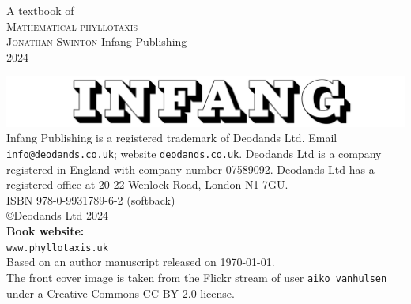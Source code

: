 \newcommand{\jPublicationYear}{2024}

\newlength{\titlepagespacing}

\setlength{\titlepagespacing}{10ex}

\thispagestyle{titlingpage}
{
	\centering
	{\Huge A textbook of }
	\\[3ex]
	{\HUGE\jEmphasisColour	\textsc{Mathematical phyllotaxis}}\\
	\vfill
	{\Huge	\scshape Jonathan Swinton}
	\vfill
	{\Large	Infang Publishing}
	\\[3ex]
	{\Large \textsc{\jPublicationYear}
		\\}
}
\newpage


\thispagestyle{titlingpage}
{
\mbox{}\vspace{\fill}
	
		\includegraphics[width=.6\jfigwidth]{./Figures/infang.jpg}
		\\[10ex]
		Infang Publishing is a registered trademark of Deodands Ltd.
		Email \texttt{info@deodands.co.uk}; website \texttt{deodands.co.uk}.
		Deodands Ltd is a company registered in England with company number 07589092. 
		Deodands Ltd has a registered office at
		20-22 Wenlock Road, London N1 7GU.
		\\[10ex] %
		{\textsc{ISBN}} 978-0-9931789-6-2 (softback)
		\\[5ex]
		\copyright Deodands Ltd \jPublicationYear
		\\[10ex]
		\textbf{Book website:}
		\\
		\texttt{www.phyllotaxis.uk}
		\\[10ex]
		{Based on an author manuscript  \jdraftnumber{} released on \today.}
		\\[10ex]
The front cover image is taken from the Flickr stream of user \texttt{aiko vanhulsen} under a Creative Commons CC BY 2.0 license.\\
}
\newpage


